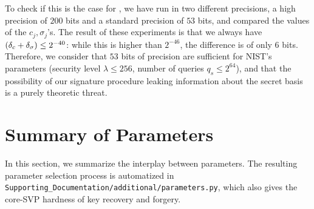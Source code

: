To check if this is the case for \falcon, we have run \falcon in two different precisions, a high precision of $200$ bits and a standard precision of $53$ bits, and compared the values of the $c_j,\sigma_j$'s. The result of these experiments is that we always have $(\delta_c +\delta_\sigma) \leq 2^{-40}$: while this is higher than $2^{-46}$, the difference is of only $6$ bits. Therefore, we consider that $53$ bits of precision are sufficient for NIST's parameters (security level $\lambda \leq 256$, number of queries $q_s \leq 2^{64}$), and that the possibility of our signature procedure leaking information about the secret basis is a purely theoretic threat.



\section{Summary of Parameters}\label{sec:parametersummary}

In this section, we summarize the interplay between parameters. The resulting parameter selection process is automatized in {\small\tt Supporting\_Documentation/additional/parameters.py}, which also gives the core-SVP hardness of key recovery and forgery.

